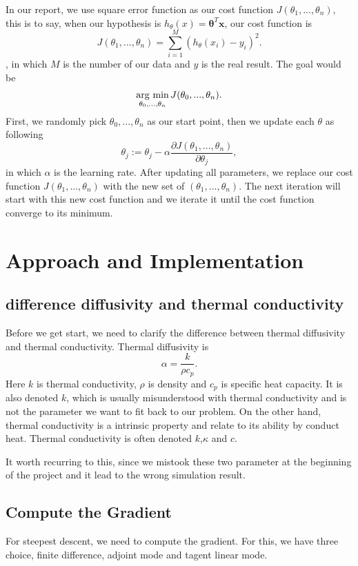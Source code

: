 \documentclass[10pt,a4paper]{report}
\newcommand{\argmin}{\mathop{\rm arg~min}\limits}
\begin{document}
In our report, we use square error function as our cost function $J(\theta_1,...,\theta_n)$, this is to say, when our hypothesis is $h_\theta(x)=\mathbf{\theta}^T \mathbf{x}$, our cost function is \[J(\theta_1,...,\theta_n)= \sum\limits_{i=1}^M (h_\theta(x_i)-y_i)^2          .\] 
, in which $M$ is the number of our data and $y$ is the real result. The goal would be \[\argmin_{\theta_0,...,\theta_n}J(\theta_0,...,\theta_n).\]  
First, we randomly pick $\theta_0,...,\theta_n$ as our start point, then we update each $\theta$ as following \[\theta_j := \theta_j - \alpha{\frac{\partial J(\theta_1,...,\theta_n)}{\partial \theta_j}},\] in which $\alpha$ is the learning rate. After updating all parameters, we replace our cost function $J(\theta_1,...,\theta_n)$ with the new set of $(\theta_1,...,\theta_n)$. The next iteration will start with this new cost function and we iterate it until the cost function converge to its minimum. 


\chapter{Approach and Implementation}
\section{difference diffusivity and thermal conductivity}

Before we get start, we need to clarify the difference between thermal diffusivity and thermal conductivity. Thermal diffusivity is \[\alpha = {\frac{k}{\rho c_p}}.\] Here $k$ is thermal conductivity, $\rho$ is density and $c_p$ is specific heat capacity. It is also denoted $k$, which is usually misunderstood with thermal conductivity and is not the parameter we want to fit back to our problem. On the other hand, thermal conductivity is a intrinsic property and relate to its ability by conduct heat. Thermal conductivity is often denoted $k$,$\kappa$ and $c$.   

It worth recurring to this, since we mistook these two parameter at the beginning of the project and it lead to the wrong simulation result.

\section{Compute the Gradient}
For steepest descent, we need to compute the gradient. For this, we have three choice, finite difference, adjoint mode and tagent linear mode. 
\end{document}
